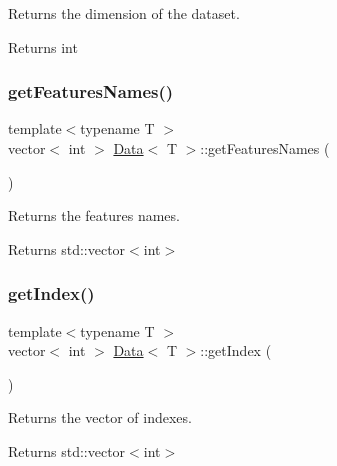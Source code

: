 Returns the dimension of the dataset. 

\begin{DoxyReturn}{Returns}
int 
\end{DoxyReturn}
\mbox{\label{class_data_a7ca6dfe5013024d75f3e13e42caa96f4}} 
\subsubsection{\texorpdfstring{get\+Features\+Names()}{getFeaturesNames()}}
{\footnotesize\ttfamily template$<$typename T $>$ \\
vector$<$ int $>$ \hyperlink{class_data}{Data}$<$ T $>$\+::get\+Features\+Names (\begin{DoxyParamCaption}{ }\end{DoxyParamCaption})}



Returns the features names. 

\begin{DoxyReturn}{Returns}
std\+::vector$<$int$>$ 
\end{DoxyReturn}
\mbox{\label{class_data_a9f64e56cea5be1f29eea9319716a3ed1}} 
\subsubsection{\texorpdfstring{get\+Index()}{getIndex()}}
{\footnotesize\ttfamily template$<$typename T $>$ \\
vector$<$ int $>$ \hyperlink{class_data}{Data}$<$ T $>$\+::get\+Index (\begin{DoxyParamCaption}{ }\end{DoxyParamCaption})}



Returns the vector of indexes. 

\begin{DoxyReturn}{Returns}
std\+::vector$<$int$>$ 
\end{DoxyReturn}
\mbox{\label{class_data_a9494572e8a2bc92fb4c10087cf35e4be}} 
